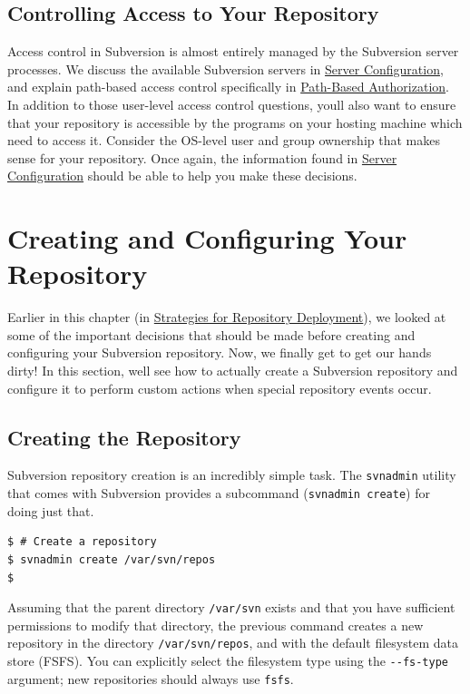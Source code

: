 \subsection{Controlling Access to Your
Repository}\label{svn.reposadmin.basics.accesscontrol}

Access control in Subversion is almost entirely managed by the
Subversion server processes. We discuss the available Subversion servers
in \hyperref[svn.serverconfig]{Server Configuration}, and explain
path-based access control specifically in
\hyperref[svn.serverconfig.pathbasedauthz]{Path-Based Authorization}. In
addition to those user-level access control questions,
you\textquotesingle ll also want to ensure that your repository is
accessible by the programs on your hosting machine which need to access
it. Consider the OS-level user and group ownership that makes sense for
your repository. Once again, the information found in
\hyperref[svn.serverconfig]{Server Configuration} should be able to help
you make these decisions.

\section{Creating and Configuring Your
Repository}\label{svn.reposadmin.create}

Earlier in this chapter (in
\hyperref[svn.reposadmin.planning]{Strategies for Repository
Deployment}), we looked at some of the important decisions that should
be made before creating and configuring your Subversion repository. Now,
we finally get to get our hands dirty! In this section,
we\textquotesingle ll see how to actually create a Subversion repository
and configure it to perform custom actions when special repository
events occur.

\subsection{Creating the
Repository}\label{svn.reposadmin.basics.creating}

Subversion repository creation is an incredibly simple task. The
\texttt{svnadmin} utility that comes with Subversion provides a
subcommand (\texttt{svnadmin\ create}) for doing just that.

\begin{verbatim}
$ # Create a repository
$ svnadmin create /var/svn/repos
$
\end{verbatim}

Assuming that the parent directory \texttt{/var/svn} exists and that you
have sufficient permissions to modify that directory, the previous
command creates a new repository in the directory
\texttt{/var/svn/repos}, and with the default filesystem data store
(FSFS). You can explicitly select the filesystem type using the
\texttt{-\/-fs-type} argument; new repositories should always use
\texttt{fsfs}.

